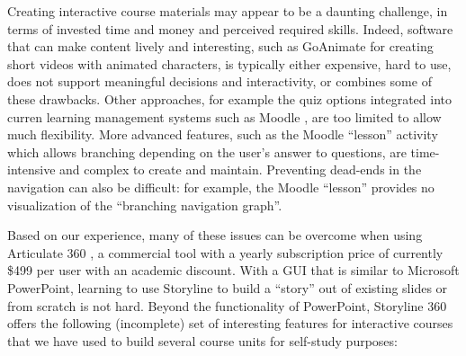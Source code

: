 \documentclass[sigconf]{acmart}
\begin{document}
Creating interactive course materials may appear to be a daunting challenge, in terms of invested
time and money and perceived required skills. Indeed, software that can
make content lively and interesting, such as GoAnimate \cite{GoAnimate} for creating short videos with animated
characters, is typically either expensive, hard to use, does not support meaningful decisions and interactivity, or
combines some of these drawbacks. Other approaches, for example the quiz options integrated into curren
learning management systems such as Moodle \cite{Moodle}, are too limited to allow much flexibility. More advanced
features, such as the Moodle ``lesson'' activity which allows branching depending on the user's answer
to questions, are time-intensive and complex to create and maintain. Preventing dead-ends in the navigation can also be
difficult: for example, the Moodle ``lesson'' provides no visualization of the ``branching navigation graph''.

Based on our experience, many of these issues can be overcome when using Articulate 360
\cite{Storyline}, a commercial tool with a yearly subscription price of currently \$499 per user
with an academic discount. With a GUI that is similar to Microsoft PowerPoint, learning to use
Storyline to build a ``story'' out of existing slides or from scratch is not hard. Beyond the functionality
of PowerPoint, Storyline 360 offers the following (incomplete) set of interesting features for
interactive courses that we have used to build several course units for self-study purposes:
\end{document}

